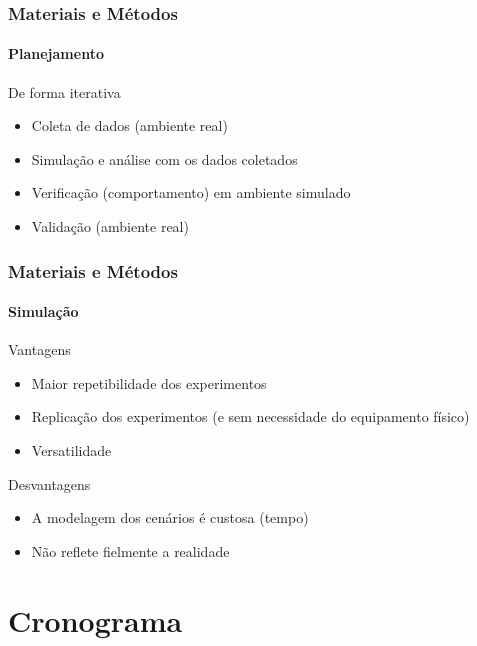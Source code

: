 \documentclass[brazil]{beamer}
\begin{document}
\begin{frame}
\frametitle{Materiais e Métodos}
\framesubtitle{Planejamento}
\begin{block}{De forma iterativa}
\begin{block}{}
\begin{itemize}
\item Coleta de dados (ambiente real)
\end{itemize}
\end{block}
\begin{block}{}
\begin{itemize}
\item Simulação e análise com os dados coletados
\item Verificação (comportamento) em ambiente simulado 
\end{itemize}
\end{block}
\begin{block}{}
\begin{itemize}
\item Validação (ambiente real)
\end{itemize}
\end{block}
\end{block}
\end{frame}


\begin{frame}
\frametitle{Materiais e Métodos}
\framesubtitle{Simulação}
\begin{block}{Vantagens}
\begin{itemize}
\item Maior repetibilidade dos experimentos
\item Replicação dos experimentos (e sem necessidade do equipamento físico)
\item Versatilidade
\end{itemize}
\end{block}
\begin{block}{Desvantagens}
\begin{itemize}
\item A modelagem dos cenários é custosa (tempo)
\item Não reflete fielmente a realidade
\end{itemize}
\end{block}
\end{frame}



\section{Cronograma}
\end{document}
